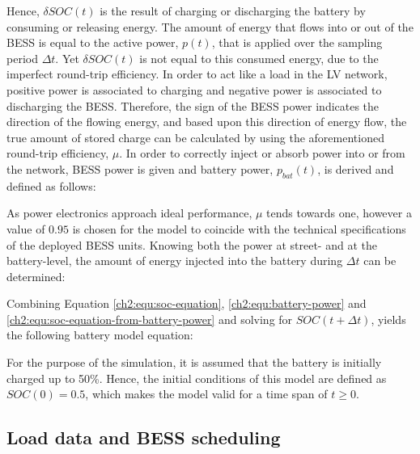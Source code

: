 

Hence, $\delta SOC(t)$ is the result of charging or discharging the battery by consuming or releasing energy.
The amount of energy that flows into or out of the BESS is equal to the active power, $p(t)$, that is applied over the sampling period $\Delta t$.
Yet $\delta SOC(t)$ is not equal to this consumed energy, due to the imperfect round-trip efficiency.
In order to act like a load in the LV network, positive power is associated to charging and negative power is associated to discharging the BESS.
Therefore, the sign of the BESS power indicates the direction of the flowing energy, and based upon this direction of energy flow, the true amount of stored charge can be calculated by using the aforementioned round-trip efficiency, $\mu$.
In order to correctly inject or absorb power into or from the network, BESS power is given and battery power, $p_{bat}(t)$, is derived and defined as follows:



As power electronics approach ideal performance, $\mu$ tends towards one, however a value of $0.95$ is chosen for the model to coincide with the technical specifications of the deployed BESS units.
Knowing both the power at street- and at the battery-level, the amount of energy injected into the battery during $\Delta t$ can be determined:



Combining Equation \ref{ch2:equ:soc-equation}, \ref{ch2:equ:battery-power} and \ref{ch2:equ:soc-equation-from-battery-power} and solving for $SOC(t+\Delta t)$, yields the following battery model equation:



For the purpose of the simulation, it is assumed that the battery is initially charged up to 50\%.
Hence, the initial conditions of this model are defined as $SOC(0) = 0.5$, which makes the model valid for a time span of $t \geq 0$.

\subsection{Load data and BESS scheduling}


